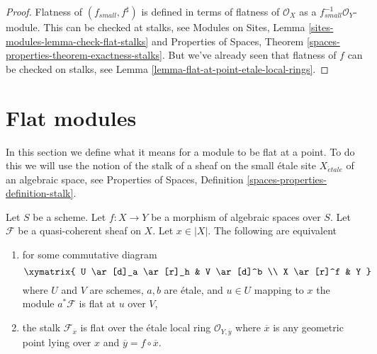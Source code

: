 \begin{proof}
Flatness of $(f_{small}, f^\sharp)$ is defined in terms of
flatness of $\mathcal{O}_X$ as a $f_{small}^{-1}\mathcal{O}_Y$-module.
This can be checked at stalks, see
Modules on Sites, Lemma \ref{sites-modules-lemma-check-flat-stalks}
and
Properties of Spaces, Theorem \ref{spaces-properties-theorem-exactness-stalks}.
But we've already seen that flatness of $f$ can be checked on stalks, see
Lemma \ref{lemma-flat-at-point-etale-local-rings}.
\end{proof}





\section{Flat modules}
\label{section-flat-modules}

\noindent
In this section we define what it means for a module to be flat at
a point. To do this we will use the notion of the stalk of a sheaf on
the small \'etale site $X_{\acute{e}tale}$ of an algebraic space, see
Properties of Spaces, Definition \ref{spaces-properties-definition-stalk}.

\begin{lemma}
\label{lemma-flat-at-point}
Let $S$ be a scheme. Let $f : X \to Y$ be a morphism of algebraic
spaces over $S$. Let $\mathcal{F}$ be a quasi-coherent sheaf on $X$.
Let $x \in |X|$. The following are equivalent
\begin{enumerate}
\item for some commutative diagram
$$
\xymatrix{
U \ar[d]_a \ar[r]_h & V \ar[d]^b \\
X \ar[r]^f & Y
}
$$
where $U$ and $V$ are schemes, $a, b$ are \'etale, and
$u \in U$ mapping to $x$ the module $a^*\mathcal{F}$ is flat at $u$ over $V$,
\item the stalk $\mathcal{F}_{\overline{x}}$ is flat over
the \'etale local ring $\mathcal{O}_{Y, \overline{y}}$
where $\overline{x}$ is any geometric point lying over
$x$ and $\overline{y} = f \circ \overline{x}$.
\end{enumerate}
\end{lemma}

